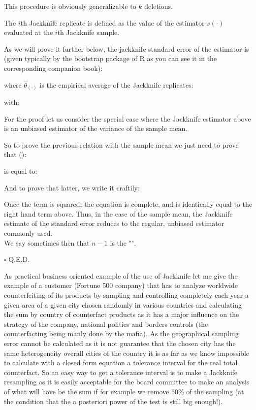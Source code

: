 	This procedure is obviously generalizable to $k$ deletions.

	The $i$th Jackknife replicate is defined as the value of the estimator $s(\cdot)$ evaluated at the $i$th Jackknife sample.
	
	As we will prove it further below, the jackknife standard error of the estimator is (given typically by the bootstrap package of R as you can see it in the corresponding companion book):
	
	where $\hat{\theta}_{(\cdot)}$ is the empirical average of the Jackknife replicates:
	
	with:
	
	For the proof let us consider the special case where the Jackknife estimator above is an unbiased estimator of the variance of the sample mean.
	\begin{dem}
	So to prove the previous relation with the sample mean we just need to prove that ():
	
	is equal to:
	
	And to prove that latter, we write it craftily:
   
   Once the term is squared, the equation is complete, and is identically equal to the right hand term above. Thus, in the case of the sample mean, the Jackknife estimate of the standard error reduces to the regular, unbiased estimator commonly used.\\
   
   	We say sometimes then that $n-1$ is the "".
	\begin{flushright}
		$\square$  Q.E.D.
	\end{flushright}
	\end{dem}
	As practical business oriented example of the use of Jackknife let me give the example of a customer (Fortune 500 company) that has to analyze worldwide counterfeiting of its products by sampling and controlling completely each year a given area of a given city chosen randomly in various countries and calculating the sum by country of counterfact products as it has a major influence on the strategy of the company, national politics and borders controls (the counterfacting being manly done by the mafia). As the geographical sampling error cannot be calculated as it is not guarantee that the chosen city has the same heterogeneity overall cities of the country it is as far as we know impossible to calculate with a closed form equation a tolerance interval for the real total counterfact. So an easy way to get a tolerance interval is to make a Jackknife resampling as it is easily acceptable for the board committee to make an analysis of what will have be the sum if for example we remove $50\%$ of the sampling (at the condition that the a posteriori power of the test is still big enough!).
	
